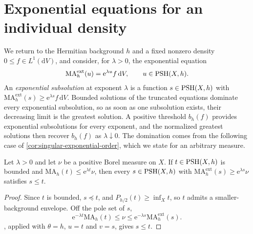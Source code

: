 \section{Exponential equations for an individual density}
\label{sec:individual-exponential-equations}

We return to the Hermitian background $h$ and a fixed nonzero density $0\leq f\in L^1(\mathrm{d}V)$, and consider, for $\lambda>0$, the exponential equation
\begin{equation}\label{eq:individual-exponential-equation}
 \mathrm{MA}^{\mathrm{ext}}_h(u)=\mathrm{e}^{\lambda u}f\,\mathrm{d}V,
 \qquad u\in\mathrm{PSH}(X,h).
\end{equation}
An \emph{exponential subsolution} at exponent $\lambda$ is a function $s\in\mathrm{PSH}(X,h)$ with $\mathrm{MA}^{\mathrm{ext}}_h(s)\geq\mathrm{e}^{\lambda s}f\,\mathrm{d}V$. Bounded solutions of the truncated equations dominate every exponential subsolution, so as soon as one subsolution exists, their decreasing limit is the greatest solution. A positive threshold $b_h(f)$ provides exponential subsolutions for every exponent, and the normalized greatest solutions then recover $b_h(f)$ as $\lambda\downarrow0$. The domination comes from the following case of \cref{cor:singular-exponential-order}, which we state for an arbitrary measure.

\begin{lemma}\label{lem:bounded-exponential-supersolution}
Let $\lambda>0$ and let $\nu$ be a positive Borel measure on $X$. If $t\in\mathrm{PSH}(X,h)$ is bounded and $\mathrm{MA}_h(t)\leq\mathrm e^{\lambda t}\nu$, then every $s\in\mathrm{PSH}(X,h)$ with $\mathrm{MA}^{\mathrm{ext}}_h(s)\geq\mathrm e^{\lambda s}\nu$ satisfies $s\leq t$.
\end{lemma}
\begin{proof}
Since $t$ is bounded, $s\preceq t$, and $P_{h/2}(t)\geq\inf_Xt$, so $t$ admits a smaller-background envelope. Off the pole set of $s$,
\[
 \mathrm e^{-\lambda t}\mathrm{MA}_h(t)\leq\nu
 \leq\mathrm e^{-\lambda s}\mathrm{MA}^{\mathrm{ext}}_h(s).
\]
, applied with $\theta=h$, $u=t$ and $v=s$, gives $s\leq t$.
\end{proof}


